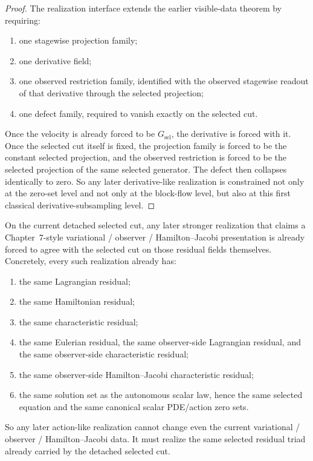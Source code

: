 \begin{proof}
The realization interface extends the earlier visible-data theorem by requiring:
\begin{enumerate}
\item one stagewise projection family;
\item one derivative field;
\item one observed restriction family, identified with the observed stagewise
      readout of that derivative through the selected projection;
\item one defect family, required to vanish exactly on the selected cut.
\end{enumerate}
Once the velocity is already forced to be \(G_{\mathrm{sel}}\), the
derivative is forced with it. Once the selected cut itself is fixed, the
projection family is forced to be the constant selected projection, and the
observed restriction is forced to be the selected projection of the same
selected generator. The defect then collapses identically to zero. So any
later derivative-like realization is constrained not only at the
zero-set level and not only at the block-flow level, but also at this first
classical derivative-subsampling level.
\end{proof}

\begin{theorem}
\label{thm:the-selected-cut-already-fixes-the-variational-contract-for-any-later-stronger-flagship-realization}
On the current detached selected cut, any later stronger realization
that claims a Chapter~7-style variational / observer / Hamilton--Jacobi
presentation is already forced to agree with the selected cut on those
residual fields themselves. Concretely, every such realization already has:
\begin{enumerate}
\item the same Lagrangian residual;
\item the same Hamiltonian residual;
\item the same characteristic residual;
\item the same Eulerian residual, the same observer-side Lagrangian residual,
      and the same observer-side characteristic residual;
\item the same observer-side Hamilton--Jacobi characteristic residual;
\item the same solution set as the autonomous scalar law, hence the same
      selected equation and the same canonical scalar PDE/action zero sets.
\end{enumerate}
So any later action-like realization cannot change even the current
variational / observer / Hamilton--Jacobi data. It must realize the same
selected residual triad already carried by the detached selected cut.
\end{theorem}


